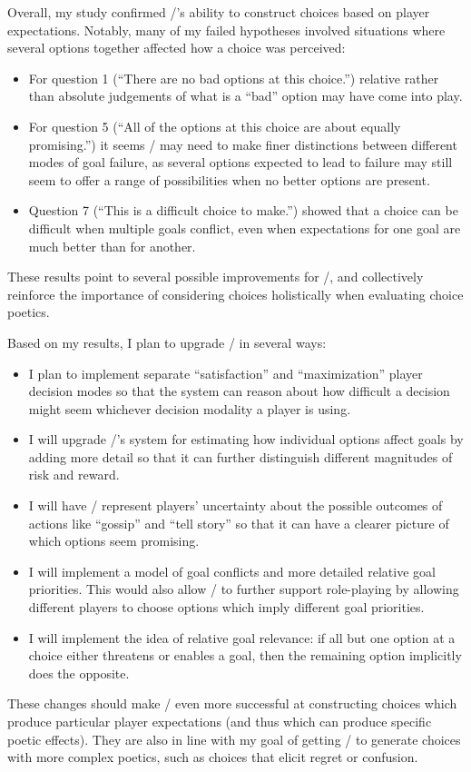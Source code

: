 Overall, my study confirmed \dunyazad/'s ability to construct choices based on player expectations.
%
Notably, many of my failed hypotheses involved situations where several options together affected how a choice was perceived:
%
\begin{itemize}
  \item For question 1 (``There are no bad options at this choice.'') relative rather than absolute judgements of what is a ``bad'' option may have come into play.
  \item For question 5 (``All of the options at this choice are about equally promising.'') it seems \dunyazad/ may need to make finer distinctions between different modes of goal failure, as several options expected to lead to failure may still seem to offer a range of possibilities when no better options are present.
  \item Question 7 (``This is a difficult choice to make.'') showed that a choice can be difficult when multiple goals conflict, even when expectations for one goal are much better than for another.
\end{itemize}
%
These results point to several possible improvements for \dunyazad/, and collectively reinforce the importance of considering choices holistically when evaluating choice poetics.


Based on my results, I plan to upgrade \dunyazad/ in several ways:
%
\begin{itemize}
  \item I plan to implement separate ``satisfaction'' and ``maximization'' player decision modes so that the system can reason about how difficult a decision might seem whichever decision modality a player is using.
  \item I will upgrade \dunyazad/'s system for estimating how individual options affect goals by adding more detail so that it can further distinguish different magnitudes of risk and reward.
  \item I will have \dunyazad/ represent players' uncertainty about the possible outcomes of actions like ``gossip'' and ``tell story'' so that it can have a clearer picture of which options seem promising.
  \item I will implement a model of goal conflicts and more detailed relative goal priorities. This would also allow \dunyazad/ to further support role-playing by allowing different players to choose options which imply different goal priorities.
  \item I will implement the idea of relative goal relevance: if all but one option at a choice either threatens or enables a goal, then the remaining option implicitly does the opposite.
\end{itemize}
%
These changes should make \dunyazad/ even more successful at constructing choices which produce particular player expectations (and thus which can produce specific poetic effects).
%
They are also in line with my goal of getting \dunyazad/ to generate choices with more complex poetics, such as choices that elicit regret or confusion.



